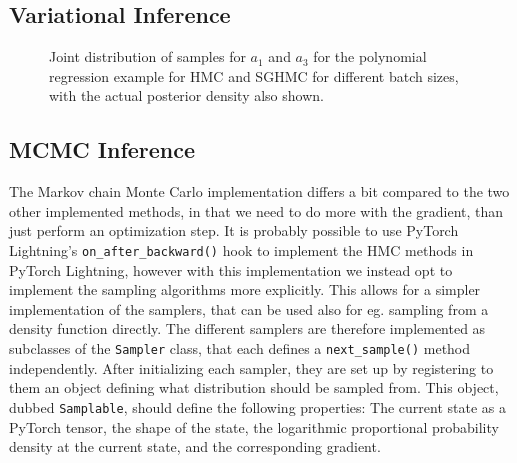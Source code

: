 \subsection{Variational Inference}
\begin{figure}[htbp]
    \centering
    \begin{subfigure}[c]{0.48\linewidth}
        \centering
        
    \end{subfigure}
    \hfill{}
    \begin{subfigure}[c]{0.48\linewidth}
        
    \end{subfigure}
    \caption{Joint distribution of samples for $a_1$ and $a_3$ for the polynomial regression example for HMC and SGHMC for different batch sizes, with the actual posterior density also shown.}
    \label{fig:vi-arch}
\end{figure}

\subsection{MCMC Inference}
The Markov chain Monte Carlo implementation differs a bit compared to the two other implemented methods, in that we need to do more with the gradient, than just perform an optimization step. 
It is probably possible to use PyTorch Lightning's \texttt{on\_after\_backward()} hook to implement the HMC methods in PyTorch Lightning, however with this implementation we instead opt to implement the sampling algorithms more explicitly.
This allows for a simpler implementation of the samplers, that can be used also for eg. sampling from a density function directly.
The different samplers are therefore implemented as  subclasses of the \texttt{Sampler} class, that each defines a \texttt{next\_sample()} method independently.
After initializing each sampler, they are set up by registering to them an object defining what distribution should be sampled from. 
This object, dubbed \texttt{Samplable}, should define the following properties: The current state as a PyTorch tensor, the shape of the state, the logarithmic proportional probability density at the current state, and the corresponding gradient.  

